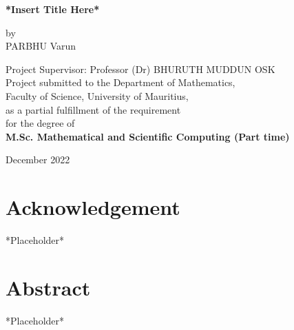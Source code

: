 \documentclass[a4paper,12pt,hidelinks]{report}
\begin{document}
\begin{titlepage}
\begin{center}
\begin{huge}
\textbf{*Insert Title Here*}\\
\end{huge}
\vspace{10mm}
\begin{huge}
by \\
PARBHU Varun \\ 
\end{huge}
\begin{large}
\vspace{15mm}
Project Supervisor: Professor (Dr) BHURUTH MUDDUN OSK \\
\vspace{15mm}
Project submitted to the Department of Mathematics,\\
Faculty of Science, University of Mauritius,\\
as a partial fulfillment of the requirement\\
for the degree of\\
\textbf{M.Sc. Mathematical and Scientific Computing (Part time)}\\
\end{large}
\vspace{30mm}
December 2022
\end{center}
\end{titlepage}
\tableofcontents


\listoffigures
{}

\listoftables
{}

\chapter*{Acknowledgement}
*Placeholder*
\chapter*{Abstract}
*Placeholder*

\nocite{*}

\end{document}
